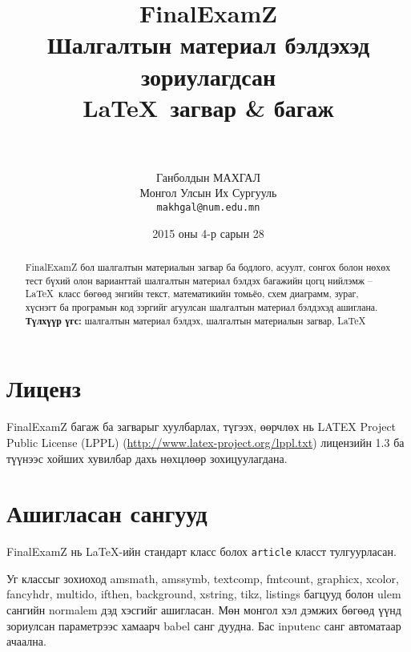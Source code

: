 \documentclass[10pt]{article}
\theoremstyle{definition}
\begin{document}
\title{
  {\Huge FinalExamZ} \\[2mm] Шалгалтын материал бэлдэхэд зориулагдсан \\ \LaTeX\, загвар \& багаж \\[2mm] \large\version \\[2mm] \normalsize \svn}
\author{
  Ганболдын МАХГАЛ\\
  Монгол Улсын Их Сургууль\\[2mm]
  \texttt{makhgal@num.edu.mn} \\[2mm]
  \www}
\newcommand{\version}{v1.4.0 -- 2016/12/24}
\newcommand{\www}{\url{https://www.galaa.net/}}
\newcommand{\svn}{\url{https://github.com/makhgal-ganbold/FinalExamZ}}
\date{2015 оны 4-р сарын 28} %
\maketitle

\begin{abstract}
FinalExamZ бол шалгалтын материалын загвар ба бодлого, асуулт, сонгох болон нөхөх тест бүхий олон варианттай шалгалтын материал бэлдэх багажийн цогц нийлэмж -- \LaTeX\, класс бөгөөд энгийн текст, математикийн томьёо, схем диаграмм, зураг, хүснэгт ба програмын код зэргийг агуулсан шалгалтын материал бэлдэхэд ашиглана.\\[2mm]
\textbf{Түлхүүр үгс:} шалгалтын материал бэлдэх, шалгалтын материалын загвар, \LaTeX
\end{abstract}

\tableofcontents

\section{Лиценз}\label{license}

FinalExamZ багаж ба загварыг хуулбарлах, түгээх, өөрчлөх нь LATEX Project Public License (LPPL) (\url{http://www.latex-project.org/lppl.txt}) лицензийн 1.3 ба түүнээс хойших хувилбар дахь нөхцлөөр зохицуулагдана.

\section{Ашигласан сангууд}

FinalExamZ нь \LaTeX-ийн стандарт класс болох \texttt{article} класст тулгуурласан.

\par Уг классыг зохиоход amsmath, amssymb, textcomp, fmtcount, graphicx, xcolor, fancyhdr, multido, ifthen, background, xstring, tikz, listings багцууд болон ulem сангийн normalem дэд хэсгийг ашигласан. Мөн монгол хэл дэмжих бөгөөд үүнд зориулсан параметрээс хамаарч babel санг дуудна. Бас inputenc санг автоматаар ачаална.
\end{document}
